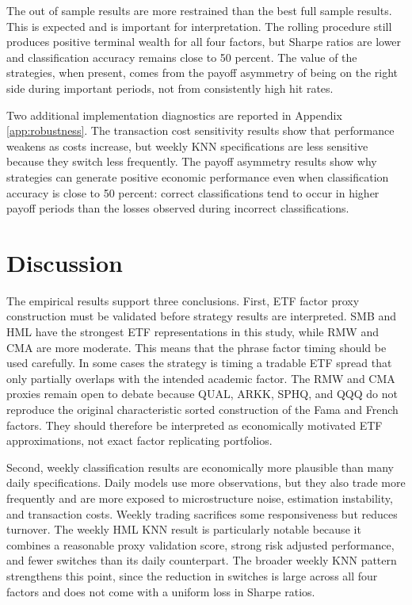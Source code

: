 \documentclass[investment,article,submit,pdftex,moreauthors]{Definitions/mdpi}
\begin{document}
The out of sample results are more restrained than the best full sample results. This is expected and is important for interpretation. The rolling procedure still produces positive terminal wealth for all four factors, but Sharpe ratios are lower and classification accuracy remains close to 50 percent. The value of the strategies, when present, comes from the payoff asymmetry of being on the right side during important periods, not from consistently high hit rates.

Two additional implementation diagnostics are reported in Appendix \ref{app:robustness}. The transaction cost sensitivity results show that performance weakens as costs increase, but weekly KNN specifications are less sensitive because they switch less frequently. The payoff asymmetry results show why strategies can generate positive economic performance even when classification accuracy is close to 50 percent: correct classifications tend to occur in higher payoff periods than the losses observed during incorrect classifications.

\section{Discussion}

The empirical results support three conclusions. First, ETF factor proxy construction must be validated before strategy results are interpreted. SMB and HML have the strongest ETF representations in this study, while RMW and CMA are more moderate. This means that the phrase factor timing should be used carefully. In some cases the strategy is timing a tradable ETF spread that only partially overlaps with the intended academic factor. The RMW and CMA proxies remain open to debate because QUAL, ARKK, SPHQ, and QQQ do not reproduce the original characteristic sorted construction of the Fama and French factors. They should therefore be interpreted as economically motivated ETF approximations, not exact factor replicating portfolios.

Second, weekly classification results are economically more plausible than many daily specifications. Daily models use more observations, but they also trade more frequently and are more exposed to microstructure noise, estimation instability, and transaction costs. Weekly trading sacrifices some responsiveness but reduces turnover. The weekly HML KNN result is particularly notable because it combines a reasonable proxy validation score, strong risk adjusted performance, and fewer switches than its daily counterpart. The broader weekly KNN pattern strengthens this point, since the reduction in switches is large across all four factors and does not come with a uniform loss in Sharpe ratios.
\end{document}
